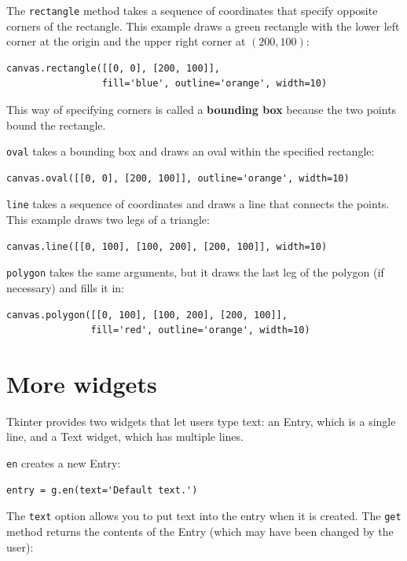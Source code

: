 \documentclass[10pt]{book}
\begin{document}

The {\tt rectangle} method takes a sequence of coordinates that
specify opposite corners of the rectangle.  This example
draws a green rectangle with the lower left corner at the origin
and the upper right corner at $(200, 100)$:

\beforeverb
\begin{verbatim}
canvas.rectangle([[0, 0], [200, 100]], 
                 fill='blue', outline='orange', width=10)
\end{verbatim}
\afterverb
%
This way of specifying corners is called
a {\bf bounding box} because the two points
bound the rectangle.


{\tt oval} takes a bounding box and draws an oval
within the specified rectangle:

\beforeverb
\begin{verbatim}
canvas.oval([[0, 0], [200, 100]], outline='orange', width=10)
\end{verbatim}
\afterverb
%
{\tt line} takes a sequence of coordinates and draws
a line that connects the points.  This example draws two legs
of a triangle:

\beforeverb
\begin{verbatim}
canvas.line([[0, 100], [100, 200], [200, 100]], width=10)
\end{verbatim}
\afterverb
%
{\tt polygon} takes the same arguments, but it draws the last
leg of the polygon (if necessary) and fills it in:

\beforeverb
\begin{verbatim}
canvas.polygon([[0, 100], [100, 200], [200, 100]],
               fill='red', outline='orange', width=10)
\end{verbatim}
\afterverb
%


\section{More widgets}


Tkinter provides two widgets that let users type text: an
Entry, which is a single line, and a Text widget, which has
multiple lines.


{\tt en} creates a new Entry:

\beforeverb
\begin{verbatim}
entry = g.en(text='Default text.')
\end{verbatim}
\afterverb
%
The {\tt text} option allows you to put text into the entry
when it is created.  The {\tt get} method returns the contents
of the Entry (which may have been changed by the user):
\end{document}
